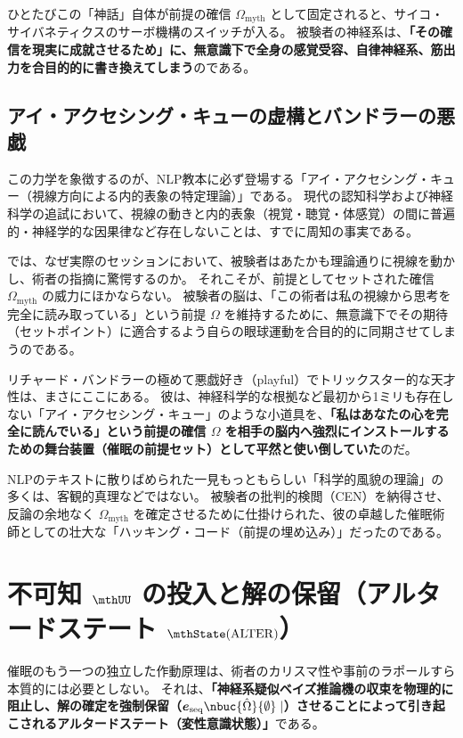 ひとたびこの「神話」自体が前提の確信 $\Omega_{\mathrm{myth}}$ として固定されると、サイコ・サイバネティクスのサーボ機構のスイッチが入る。
被験者の神経系は、\textbf{「その確信を現実に成就させるため」に、無意識下で全身の感覚受容、自律神経系、筋出力を合目的的に書き換えてしまう}のである。

\subsection{アイ・アクセシング・キューの虚構とバンドラーの悪戯}
この力学を象徴するのが、NLP教本に必ず登場する「アイ・アクセシング・キュー（視線方向による内的表象の特定理論）」である。
現代の認知科学および神経科学の追試において、視線の動きと内的表象（視覚・聴覚・体感覚）の間に普遍的・神経学的な因果律など存在しないことは、すでに周知の事実である。

では、なぜ実際のセッションにおいて、被験者はあたかも理論通りに視線を動かし、術者の指摘に驚愕するのか。
それこそが、前提としてセットされた確信 $\Omega_{\mathrm{myth}}$ の威力にほかならない。
被験者の脳は、「この術者は私の視線から思考を完全に読み取っている」という前提 $\Omega$ を維持するために、無意識下でその期待（セットポイント）に適合するよう自らの眼球運動を合目的的に同期させてしまうのである。

リチャード・バンドラーの極めて悪戯好き（playful）でトリックスター的な天才性は、まさにここにある。
彼は、神経科学的な根拠など最初から1ミリも存在しない「アイ・アクセシング・キュー」のような小道具を、\textbf{「私はあなたの心を完全に読んでいる」という前提の確信 $\Omega$ を相手の脳内へ強烈にインストールするための舞台装置（催眠の前提セット）として平然と使い倒していた}のだ。

NLPのテキストに散りばめられた一見もっともらしい「科学的風貌の理論」の多くは、客観的真理などではない。
被験者の批判的検閲（CEN）を納得させ、反論の余地なく $\Omega_{\mathrm{myth}}$ を確定させるために仕掛けられた、彼の卓越した催眠術師としての壮大な「ハッキング・コード（前提の埋め込み）」だったのである。

\section{不可知 $\mthUU$ の投入と解の保留（アルタードステート $\mthState(\mathrm{ALTER})$）}

催眠のもう一つの独立した作動原理は、術者のカリスマ性や事前のラポールすら本質的には必要としない。
それは、\textbf{「神経系疑似ベイズ推論機の収束を物理的に阻止し、解の確定を強制保留（$\boldsymbol{e}_{\mathrm{seq}} \nbuc{\hat{\Omega}}{\emptyset} \mid$）させることによって引き起こされるアルタードステート（変性意識状態）」}である。

